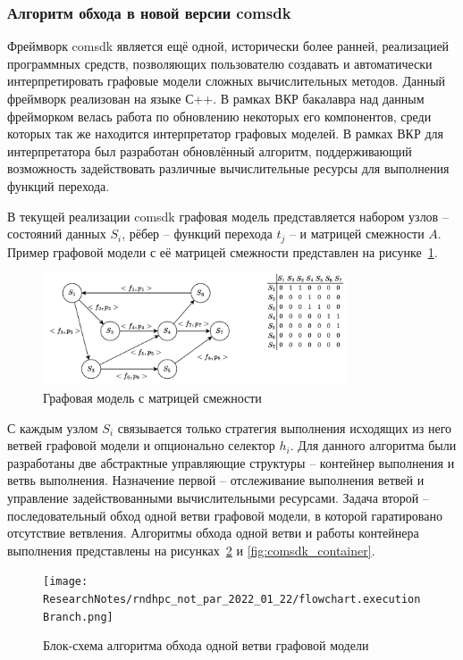 \subsubsection{Алгоритм обхода в новой версии comsdk}
Фреймворк comsdk является ещё одной, исторически более ранней, реализацией программных средств, позволяющих пользователю создавать и автоматически интерпретировать графовые модели сложных вычислительных методов. Данный фреймворк реализован на языке С++. В рамках ВКР бакалавра над данным фрейморком велась работа по обновлению некоторых его компонентов, среди которых так же находится интерпретатор графовых моделей. В рамках ВКР для интерпретатора был разработан обновлённый алгоритм, поддерживающий возможность задействовать различные вычислительные ресурсы для выполнения функций перехода.

В текущей реализации comsdk графовая модель представляется набором узлов -- состояний данных $S_i$, рёбер -- функций перехода $t_j$ -- и матрицей смежности $A$. Пример графовой модели с её матрицей смежности представлен на рисунке~\ref{fig:graphWithAdjMatrix}. 
\begin{figure}[H]
	\centering
	\includegraphics[width=0.8\textwidth]{ResearchNotes/rndhpc_not_par_2023_01_22/example.pdf}
	\caption{Графовая модель с матрицей смежности}
	\label{fig:graphWithAdjMatrix}
\end{figure}

С каждым узлом $S_i$ связывается только стратегия выполнения исходящих из него ветвей графовой модели и опционально селектор $h_i$. Для данного алгоритма были разработаны две абстрактные управляющие структуры -- контейнер выполнения и ветвь выполнения. Назначение первой -- отслеживание выполнения ветвей и управление задействованными вычислительными ресурсами. Задача второй -- последовательный обход одной ветви графовой модели, в которой гаратировано отсутствие ветвления. Алгоритмы обхода одной ветви и работы контейнера выполнения представлены на рисунках~\ref{fig:comsdk_branch} и \ref{fig:comsdk_container}.

\begin{figure}[H]
	\centering
	\texttt{[image: ResearchNotes/rndhpc\_not\_par\_2022\_01\_22/flowchart.executionBranch.png]}
	\caption{Блок-схема алгоритма обхода одной ветви графовой модели}
	\label{fig:comsdk_branch}
\end{figure}

